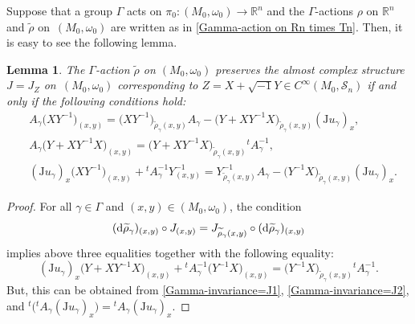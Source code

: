 \documentclass[pdftex]{sigma}
\numberwithin{equation}{section}
\newtheorem{Lemma}[Theorem]{Lemma}
\newcommand{\R}{\mathbb{R}}
\renewcommand{\tilde}{\widetilde}
\def\J{\mathrm{J}}
\begin{document}
Suppose that a group $\Gamma$ acts on $\pi_0\colon (M_0,\omega_0)\to \R^n$ and the $\Gamma$-actions $\rho$ on $\R^n$ and $\tilde \rho$ on~$(M_0,\omega_0)$ are written as in \eqref{Gamma-action on Rn times Tn}. Then, it is easy to see the following lemma.
\begin{Lemma}
The $\Gamma$-action ${\tilde \rho}$ on $(M_0,\omega_0)$ preserves the almost complex structure $J=J_Z$ on~$(M_0,\omega_0)$ corresponding to $Z=X+\sqrt{-1}Y\in C^\infty ( M_0,{\mathcal S}_n)$ if and only if the following conditions hold:
\begin{align}
& A_\gamma\bigl(XY^{-1}\bigr)_{(x,y)}=\bigl(XY^{-1}\bigr)_{{\tilde \rho}_\gamma (x,y)}A_\gamma-\bigl(Y+XY^{-1}X\bigr)_{{\tilde \rho}_\gamma (x,y)}(\J u_\gamma)_x , \label{Gamma-invariance=J1}\\
& A_\gamma\bigl(Y+XY^{-1}X\bigr)_{(x,y)}=\bigl(Y+XY^{-1}X\bigr)_{{\tilde \rho}_\gamma (x,y)} {}^tA_\gamma^{-1},\label{Gamma-invariance=J2} \\
& (\J u_\gamma)_x\bigl(XY^{-1}\bigr)_{(x,y)}+{}^tA_\gamma^{-1}Y^{-1}_{(x,y)}=Y^{-1}_{{\tilde \rho}_\gamma (x,y)}A_\gamma -\bigl(Y^{-1}X\bigr)_{{\tilde \rho}_\gamma (x,y)}(\J u_\gamma)_x.\nonumber
\end{align}
\end{Lemma}
\begin{proof}
For all $\gamma \in \Gamma$ and $(x,y)\in (M_0,\omega_0)$, the condition
\[
({\rm d}{\tilde \rho}_\gamma)_{(x,y)}\circ J_{(x,y)}=J_{{\tilde \rho}_\gamma (x,y)}\circ ({\rm d}{\tilde \rho}_\gamma)_{(x,y)}
\]
 implies above three equalities together with the following equality:
\[
(\J u_\gamma)_x\bigl(Y+XY^{-1}X\bigr)_{(x,y)}+{}^tA_\gamma^{-1}\bigl(Y^{-1}X\bigr)_{(x,y)}=\bigl(Y^{-1}X\bigr)_{{\tilde \rho}_\gamma (x,y)}{}^tA_\gamma^{-1}.
\]
But, this can be obtained from \eqref{Gamma-invariance=J1}, \eqref{Gamma-invariance=J2}, and ${}^t\bigl({}^tA_\gamma (\J u_\gamma)_x\bigr)={}^tA_\gamma (\J u_\gamma)_x$.
\end{proof}
\end{document}

